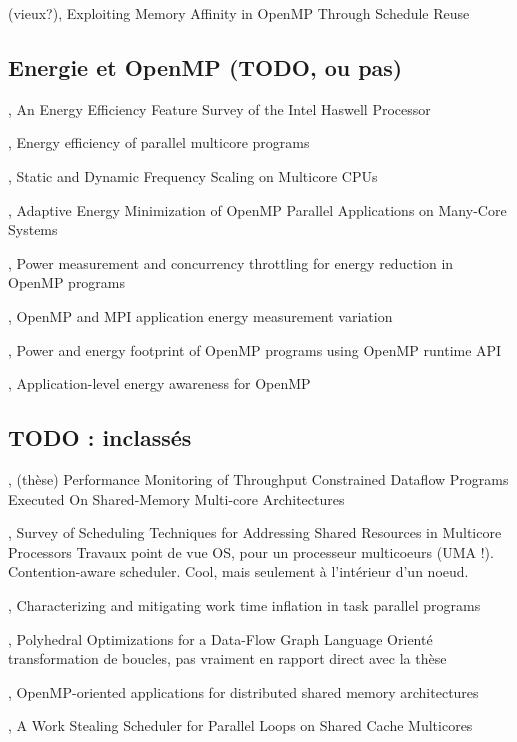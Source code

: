 (vieux?)\cite{Nikolopoulos2001}, Exploiting Memory Affinity in OpenMP Through Schedule Reuse



\subsection{Energie et OpenMP (TODO, ou pas)}


\cite{Hackenberg2015}, An Energy Efficiency Feature Survey of the Intel Haswell Processor

\cite{Davidovic2015}, Energy efficiency of parallel multicore programs

\cite{Bao2016}, Static and Dynamic Frequency Scaling on Multicore CPUs

\cite{Shafik2015}, Adaptive Energy Minimization of OpenMP Parallel Applications on Many-Core Systems

\cite{Porterfield2013}, Power measurement and concurrency throttling for energy reduction in OpenMP programs

\cite{Porterfield2013a}, OpenMP and MPI application energy measurement variation

\cite{Nandamuri2015}, Power and energy footprint of OpenMP programs using OpenMP runtime API

\cite{Alessi2015}, Application-level energy awareness for OpenMP


\subsection{TODO : inclassés}

\cite{Selva2015}, (thèse) Performance Monitoring of Throughput Constrained Dataflow Programs Executed On Shared-Memory Multi-core Architectures

\cite{Zhuravlev2012}, Survey of Scheduling Techniques for Addressing Shared Resources in Multicore Processors
Travaux point de vue OS, pour un processeur multicoeurs (UMA !).
Contention-aware scheduler.
Cool, mais seulement à l'intérieur d'un noeud.

\cite{Olivier2013}, Characterizing and mitigating work time inflation in task parallel programs


\cite{Sbirlea2015}, Polyhedral Optimizations for a Data-Flow Graph Language
Orienté transformation de boucles, pas vraiment en rapport direct avec la thèse


\cite{Marowka2004}, OpenMP-oriented applications for distributed shared memory architectures


\cite{Tchiboukdjian2010}, A Work Stealing Scheduler for Parallel Loops on Shared Cache Multicores

